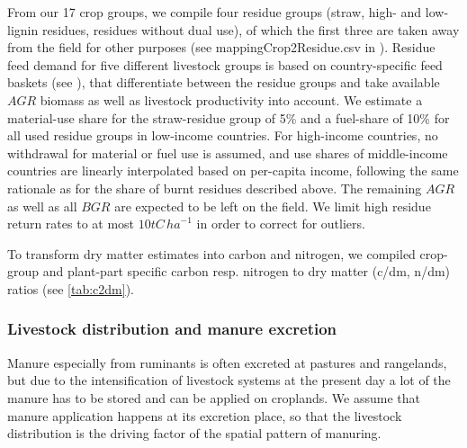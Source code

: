 \documentclass[gc, manuscript]{copernicus}
\begin{document}
From our 17 crop groups, we compile four residue groups (straw, high- and low-lignin residues, residues without dual use), of which the first three are taken away from the field for other purposes (see mappingCrop2Residue.csv in \citep{bodirsky_mrcommons_2020}). Residue feed demand for five different livestock groups is based on country-specific feed baskets (see \citep{weindl_livestock_2017}), that differentiate between the residue groups and take available \(AGR\) biomass as well as livestock productivity into account. We estimate a material-use share for the straw-residue group of 5\% and a fuel-share of 10\% for all used residue groups in low-income countries. For high-income countries, no withdrawal for material or fuel use is assumed, and use shares of middle-income countries are linearly interpolated based on per-capita income, following the same rationale as for the share of burnt residues described above. The remaining \(AGR\) as well as all \(BGR\) are expected to be left on the field. We limit high residue return rates to at most \(10\unit{tC\,ha}^{-1}\) in order to correct for outliers.

To transform dry matter estimates into carbon and nitrogen, we compiled crop-group and plant-part specific carbon resp. nitrogen to dry matter (c/dm, n/dm) ratios (see \ref{tab:c2dm}).

\hypertarget{sec:livstmanure}{%
\subsubsection{Livestock distribution and manure excretion}\label{sec:livstmanure}}

Manure especially from ruminants is often excreted at pastures and rangelands, but due to the intensification of livestock systems at the present day a lot of the manure has to be stored and can be applied on croplands. We assume that manure application happens at its excretion place, so that the livestock distribution is the driving factor of the spatial pattern of manuring.
\end{document}
